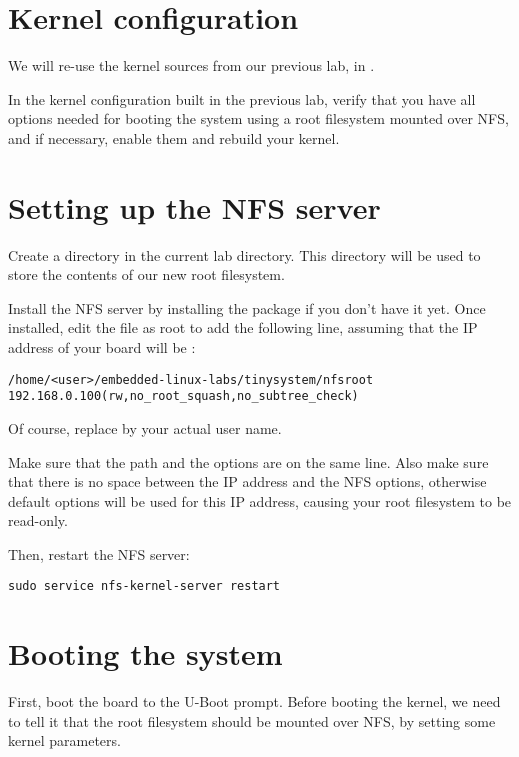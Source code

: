 \section{Kernel configuration}

We will re-use the kernel sources from our previous lab, in
.

In the kernel configuration built in the previous lab, verify that you
have all options needed for booting the system using a root filesystem
mounted over NFS, and if necessary, enable them and rebuild your
kernel.

\section{Setting up the NFS server}

Create a  directory in the current lab directory. This
 directory will be used to store the contents of our new
root filesystem.

Install the NFS server by installing the 
package if you don't have it yet. Once installed, edit the
 file as root to add the following line, assuming that the
IP address of your board will be :

\footnotesize
\begin{verbatim}
/home/<user>/embedded-linux-labs/tinysystem/nfsroot 192.168.0.100(rw,no_root_squash,no_subtree_check)
\end{verbatim}
\normalsize

Of course, replace  by your actual user name.

Make sure that the path and the options are on the same line.
Also make sure that there is no space between the IP address and the NFS
options, otherwise default options will be used for this IP address,
causing your root filesystem to be read-only.

Then, restart the NFS server:

\begin{verbatim}
sudo service nfs-kernel-server restart
\end{verbatim}

\section{Booting the system}

First, boot the board to the U-Boot prompt. Before booting the kernel,
we need to tell it that the root filesystem should be mounted over
NFS, by setting some kernel parameters.

